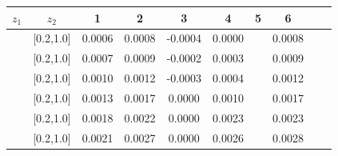 \begin{table}[H]\scriptsize
\centering
\begin{tabular}{|c| c| c| c| c| c| c| c| c| c|}
\hline
$z_1$ & $z_2$ & 1 & 2 & 3 & 4& 5& 6 \\ \hline
[0.2,0.3]	&	[0.2,1.0]	&	0.0006	&	0.0008	&	-0.0004	&	0.0000	&		&	0.0008	\\ \hline
[0.3,0.4]	&	[0.2,1.0]	&	0.0007	&	0.0009	&	-0.0002	&	0.0003	&		&	0.0009	\\ \hline
[0.4,0.5]	&	[0.2,1.0]	&	0.0010	&	0.0012	&	-0.0003	&	0.0004	&		&	0.0012	\\ \hline
[0.5,0.6]	&	[0.2,1.0]	&	0.0013	&	0.0017	&	0.0000	&	0.0010	&		&	0.0017	\\ \hline
[0.6,0.7]	&	[0.2,1.0]	&	0.0018	&	0.0022	&	0.0000	&	0.0023	&		&	0.0023	\\ \hline
[0.7,1.0]	&	[0.2,1.0]	&	0.0021	&	0.0027	&	0.0000	&	0.0026	&		&	0.0028	\\ \hline
															

\end{tabular}
\end{table}
